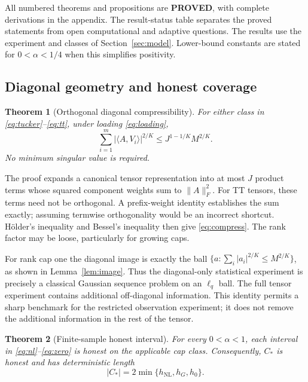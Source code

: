 \documentclass[11pt]{article}
\newtheorem{theorem}{Theorem}
\theoremstyle{remark}
\newcommand{\ip}[2]{\langle #1,#2\rangle}
\newcommand{\norm}[1]{\lVert #1\rVert}
\newcommand{\NL}{\mathrm{NL}}
\begin{document}
All numbered theorems and propositions are \textbf{PROVED}, with complete derivations in the appendix. The result-status table separates the proved statements from open computational and adaptive questions. The results use the experiment and classes of Section~\ref{sec:model}. Lower-bound constants are stated for $0<\alpha<1/4$ when this simplifies positivity.

\subsection{Diagonal geometry and honest coverage}

\begin{theorem}[Orthogonal diagonal compressibility]\label{thm:diagonal}
For either class in \eqref{eq:tucker}--\eqref{eq:tt}, under loading \eqref{eq:loading},
\begin{equation}\label{eq:compress}
 \sum_{i=1}^m|\ip A{V_i}|^{2/K}\le J^{1-1/K}M^{2/K}.
\end{equation}
No minimum singular value is required.
\end{theorem}

The proof expands a canonical tensor representation into at most $J$ product terms whose squared component weights sum to $\norm A_F^2$. For TT tensors, these terms need not be orthogonal. A prefix-weight identity establishes the sum exactly; assuming termwise orthogonality would be an incorrect shortcut. H\"older's inequality and Bessel's inequality then give \eqref{eq:compress}. The rank factor may be loose, particularly for growing caps.

For rank cap one the diagonal image is exactly the ball $\{a:\sum_i|a_i|^{2/K}\le M^{2/K}\}$, as shown in Lemma~\ref{lem:image}. Thus the diagonal-only statistical experiment is precisely a classical Gaussian sequence problem on an $\ell_q$ ball. The full tensor experiment contains additional off-diagonal information. This identity permits a sharp benchmark for the restricted observation experiment; it does not remove the additional information in the rest of the tensor.

\begin{theorem}[Finite-sample honest interval]\label{thm:coverage}
For every $0<\alpha<1$, each interval in \eqref{eq:nl}--\eqref{eq:zero} is honest on the applicable cap class. Consequently, $C_*$ is honest and has deterministic length
\begin{equation}\label{eq:length}
 |C_*|=2\min\{h_{\NL},h_G,h_0\}.
\end{equation}
\end{theorem}
\end{document}
